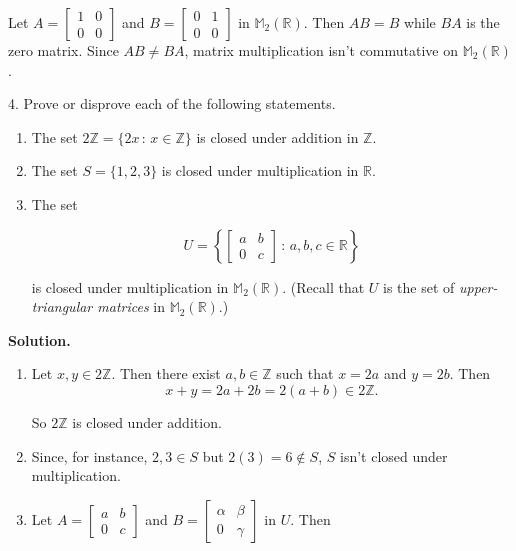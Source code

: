 \documentclass[10pt,]{book}
\theoremstyle{plain}
\theoremstyle{definition}
\theoremstyle{definition}
\theoremstyle{definition}
\theoremstyle{definition}
\numberwithin{equation}{section}
\def\Z{\mathbb{Z}}
\def\R{\mathbb{R}}
\def\M{\mathbb{M}}
\newcommand{\amp}{ & }
\begin{document}
\begin{exerciselist}
      Let \(A=\begin{bmatrix}1 \amp 0 \\ 0 \amp 0\end{bmatrix}\) and \(B = \begin{bmatrix}0 \amp 1 \\ 0 \amp 0\end{bmatrix}\)
in \(\M_2(\R)\). Then \(AB=B\) while \(BA\) is the zero matrix. Since \(AB\neq BA\), matrix multiplication isn't commutative on \(\M_2(\R)\).
\item[4.]\hypertarget{exercise-10}{}
        Prove or disprove each of the following statements.
        \leavevmode%
\begin{enumerate}[label=(\alph*)]
\item\hypertarget{li-68}{}
              The set \(2\Z=\{2x\,:\,x\in \Z\}\) is closed under addition in \(\Z\).
\item\hypertarget{li-69}{}
              The set \(S=\{1,2,3\}\) is closed under multiplication in \(\R\).
\item\hypertarget{li-70}{}
              The set

%
\begin{equation*}
U=\left\{
\begin{bmatrix}
	a    \amp    b\\
	0 \amp c \end{bmatrix}\,:\,a,b,c\in \R\right\}
\end{equation*}


              is closed under multiplication in \(\M_2(\R)\). (Recall that \(U\) is  the set of \emph{upper-triangular matrices} in \(\M_2(\R)\).)
\end{enumerate}

\par\smallskip
\par\smallskip
\noindent\textbf{Solution.}\hypertarget{solution-10}{}\quad
\leavevmode%
\begin{enumerate}[label=(\alph*)]
\item\hypertarget{li-71}{}
          Let \(x, y\in 2\Z\). Then there exist \(a,b\in \Z\) such that \(x=2a\) and \(y=2b\).  Then
\begin{equation*}

            x+y=2a+2b=2(a+b)\in 2\Z.
          
\end{equation*}

          So \(2\Z\) is closed under addition.
\item\hypertarget{li-72}{}
          Since, for instance, \(2,3\in S\) but \(2(3)=6\not\in S\), \(S\) isn't closed under multiplication.
\item\hypertarget{li-73}{}
          Let \(A=\begin{bmatrix}a \amp b \\ 0 \amp c\end{bmatrix}\) and \(B=\begin{bmatrix}\alpha \amp \beta \\ 0 \amp \gamma\end{bmatrix}\) in \(U\). 
Then 


\end{enumerate}
\end{exerciselist}
\end{document}
